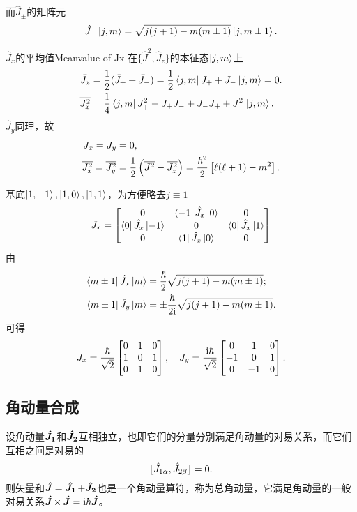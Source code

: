 而$\hat J_\pm$的矩阵元
\begin{align}
	\hat J_\pm\left\vert j,m\right\rangle=\sqrt{j(j+1)-m(m\pm 1)}\left\vert j,m\pm 1\right\rangle.
\end{align}
\begin{example}{$\hat J_x$的平均值}{Meanvalue of Jx}
	在$\{\hat J^2,\hat J_z\}$的本征态$\left\vert j,m\right\rangle$上
	\begin{align*}
		\bar J_x&=\frac12(\bar J_++\bar J_-)=\frac12\left\langle j,m\right\vert J_++J_-\left\vert j,m\right\rangle=0.\\
		\overline{J_x^2}&=\frac14\left\langle j,m\right\vert J_+^2+J_+J_-+J_-J_++J_-^2\left\vert j,m\right\rangle.
	\end{align*}
	$\hat J_y$同理，故
	\begin{align*}
		\bar J_x=\bar J_y&=0,\\
		\overline{J_x^2}=\overline{J_y^2}&=\frac12\left(\overline{J^2}-\overline{J_z^2}\right)=\frac{\hbar^2}2\left[\ell(\ell+1)-m^2\right].
	\end{align*}
\end{example}
\begin{example}{}{}
	基底$\left\vert 1,-1\right\rangle,\left\vert 1,0\right\rangle,\left\vert 1,1\right\rangle$，为方便略去$j\equiv 1$ %
	\begin{align*}
		J_x=\begin{bmatrix}
			0&\left\langle -1\right\vert\hat J_x\left\vert 0\right\rangle&0\\
			\left\langle 0\right\vert\hat J_x\left\vert -1\right\rangle&0&\left\langle 0\right\vert\hat J_x\left\vert 1\right\rangle\\
			0&\left\langle 1\right\vert\hat J_x\left\vert 0\right\rangle&0
		\end{bmatrix}
	\end{align*}
	由
	\begin{align*}
		\left\langle m\pm 1\right\vert\hat J_x\left\vert m\right\rangle&=\frac\hbar{2}\sqrt{j(j+1)-m(m\pm 1)};\\
		\left\langle m\pm 1\right\vert\hat J_y\left\vert m\right\rangle&=\pm\frac\hbar{2\mathrm{i}}\sqrt{j(j+1)-m(m\pm 1)}.
	\end{align*}
	可得 
	\begin{align*}
		J_x=\frac\hbar{\sqrt2}\begin{bmatrix}
			0&1&0\\1&0&1\\0&1&0
		\end{bmatrix},\quad J_y=\frac{\mathrm{i}\hbar}{\sqrt2}\begin{bmatrix}
			0&1&0\\-1&0&1\\0&-1&0
		\end{bmatrix}.
	\end{align*}
\end{example}
\subsection{角动量合成}
设角动量$\bm{\hat J_1}\!\mathop{}$和$\bm{\hat J_2}\!\mathop{}$互相独立，也即它们的分量分别满足角动量的对易关系，而它们互相之间是对易的
\[
	\lfloor\hspace{-4.7 pt}\lceil \hat J_{1\alpha},\hat J_{2\beta}\rceil\hspace{-4.7 pt}\rfloor=0.
\]
则矢量和$\bm{\hat J}\!\mathop{}=\bm{\hat J_1}\!\mathop{}+\bm{\hat J_2}\!\mathop{}$也是一个角动量算符，称为总角动量，它满足角动量的一般对易关系$\bm{\hat J}\!\mathop{}\times\,\bm{\hat J}\!\mathop{}=\mathrm{i}\hbar\bm{\hat J}\!\mathop{}$。

